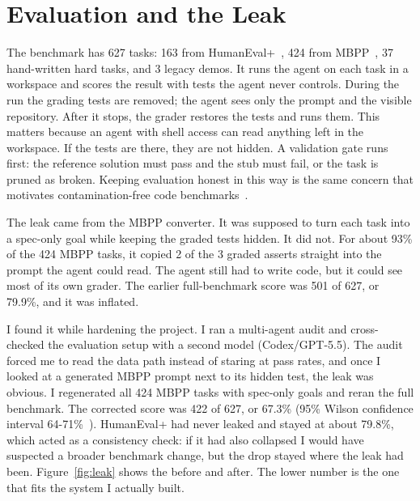 \documentclass[11pt]{article}
\begin{document}
\section{Evaluation and the Leak}
The benchmark has 627 tasks: 163 from HumanEval+~\cite{humaneval,evalplus}, 424 from MBPP~\cite{mbpp}, 37
hand-written hard tasks, and 3 legacy demos. It runs the agent on each task in a workspace and scores the
result with tests the agent never controls. During the run the grading tests are removed; the agent sees
only the prompt and the visible repository. After it stops, the grader restores the tests and runs them.
This matters because an agent with shell access can read anything left in the workspace. If the tests are
there, they are not hidden. A validation gate runs first: the reference solution must pass and the stub
must fail, or the task is pruned as broken. Keeping evaluation honest in this way is the same concern that
motivates contamination-free code benchmarks~\cite{livecodebench}.

The leak came from the MBPP converter. It was supposed to turn each task into a spec-only goal while
keeping the graded tests hidden. It did not. For about 93\% of the 424 MBPP tasks, it copied 2 of the 3
graded asserts straight into the prompt the agent could read. The agent still had to write code, but it
could see most of its own grader. The earlier full-benchmark score was 501 of 627, or 79.9\%, and it was
inflated.

I found it while hardening the project. I ran a multi-agent audit and cross-checked the evaluation setup
with a second model (Codex/GPT-5.5). The audit forced me to read the data path instead of staring at pass
rates, and once I looked at a generated MBPP prompt next to its hidden test, the leak was obvious. I
regenerated all 424 MBPP tasks with spec-only goals and reran the full benchmark. The corrected score was
422 of 627, or 67.3\% (95\% Wilson confidence interval 64-71\%~\cite{wilson}). HumanEval+ had never
leaked and stayed at about 79.8\%, which acted as a consistency check: if it had also collapsed I would
have suspected a broader benchmark change, but the drop stayed where the leak had been. Figure~\ref{fig:leak}
shows the before and after. The lower number is the one that fits the system I actually built.
\end{document}
